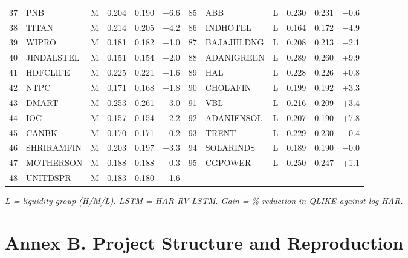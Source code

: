 \documentclass[11pt,a4paper]{article}
\let\oldsection\section
\renewcommand{\section}{\FloatBarrier\needspace{6\baselineskip}\oldsection}
\begin{document}
\begin{table}[H]
\begin{adjustbox}{max width=\textwidth}
\begin{tabular}{rlcrrr|rlcrrr}
37 & PNB & M & 0.204 & 0.190 & +6.6 & 85 & ABB & L & 0.230 & 0.231 & $-$0.6 \\
38 & TITAN & M & 0.214 & 0.205 & +4.2 & 86 & INDHOTEL & L & 0.164 & 0.172 & $-$4.9 \\
39 & WIPRO & M & 0.181 & 0.182 & $-$1.0 & 87 & BAJAJHLDNG & L & 0.208 & 0.213 & $-$2.1 \\
40 & JINDALSTEL & M & 0.151 & 0.154 & $-$2.0 & 88 & ADANIGREEN & L & 0.289 & 0.260 & +9.9 \\
41 & HDFCLIFE & M & 0.225 & 0.221 & +1.6 & 89 & HAL & L & 0.228 & 0.226 & +0.8 \\
42 & NTPC & M & 0.171 & 0.168 & +1.8 & 90 & CHOLAFIN & L & 0.199 & 0.192 & +3.3 \\
43 & DMART & M & 0.253 & 0.261 & $-$3.0 & 91 & VBL & L & 0.216 & 0.209 & +3.4 \\
44 & IOC & M & 0.157 & 0.154 & +2.2 & 92 & ADANIENSOL & L & 0.207 & 0.190 & +7.8 \\
45 & CANBK & M & 0.170 & 0.171 & $-$0.2 & 93 & TRENT & L & 0.229 & 0.230 & $-$0.4 \\
46 & SHRIRAMFIN & M & 0.203 & 0.197 & +3.3 & 94 & SOLARINDS & L & 0.189 & 0.190 & $-$0.0 \\
47 & MOTHERSON & M & 0.188 & 0.188 & +0.3 & 95 & CGPOWER & L & 0.250 & 0.247 & +1.1 \\
48 & UNITDSPR & M & 0.183 & 0.180 & +1.6 &  &  & & & &  \\
\bottomrule
\end{tabular}
\end{adjustbox}
\par\smallskip\parbox{0.95\textwidth}{\footnotesize\itshape L = liquidity group (H/M/L). LSTM = HAR-RV-LSTM. Gain = \% reduction in QLIKE against log-HAR.}
\end{table}


\clearpage
\section*{Annex B. Project Structure and Reproduction}
\end{document}
